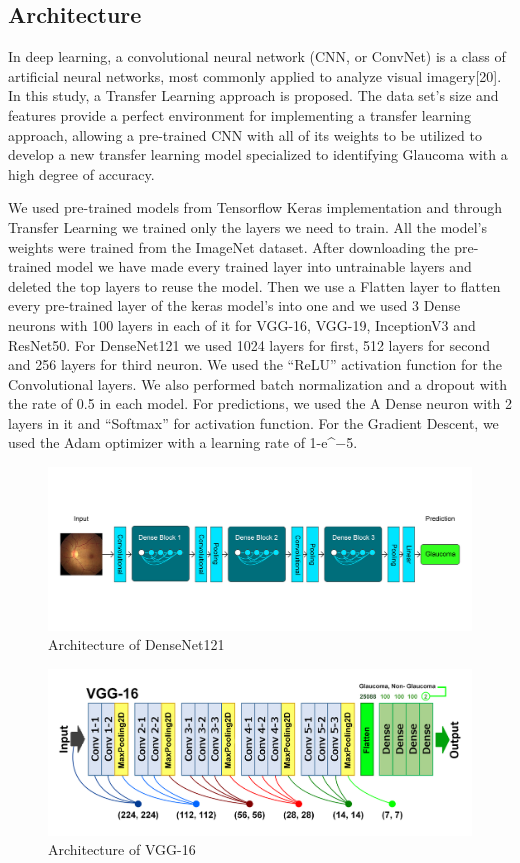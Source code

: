 \documentclass[conference]{IEEEtran}
\begin{document}
\subsection{Architecture}
In deep learning, a convolutional neural network (CNN, or ConvNet) is a class of artificial neural networks, most commonly applied to analyze visual imagery[20]. In this study, a Transfer Learning approach is proposed. The data set’s size and features provide a perfect environment for implementing a transfer learning approach, allowing a pre-trained CNN with all of its weights to be utilized to develop a new transfer learning model specialized to identifying Glaucoma with a high degree of accuracy. 

\noindent We used pre-trained models from Tensorflow Keras implementation and through Transfer Learning we trained only the layers we need to train. All the model's weights were trained from the ImageNet dataset. After downloading the pre-trained model we have made every trained layer into untrainable layers and deleted the top layers to reuse the model. Then we use a Flatten layer to flatten every pre-trained layer of the keras model's into one and we used 3 Dense neurons with 100 layers in each of it for VGG-16, VGG-19, InceptionV3 and ResNet50. For DenseNet121 we used 1024 layers for first, 512 layers for second and 256 layers for third neuron. We used the “ReLU” activation function for the Convolutional layers. We also performed batch normalization and a dropout with the rate of 0.5 in each model. For predictions, we used the A Dense neuron with 2 layers in it and “Softmax” for activation function. For the Gradient Descent, we used the Adam optimizer with a learning rate of 1-e^{−5}.

\begin{figure}[hbt!]
\centerline{\includegraphics[scale=0.25]{densenet archinew.png}}
\caption{Architecture of DenseNet121}
\label{fig}
\end{figure}


\begin{figure}[hbt!]
\centerline{\includegraphics[scale=0.4]{vgg16 architecture.png}}
\caption{Architecture of VGG-16}
\label{fig}
\end{figure}
\end{document}
